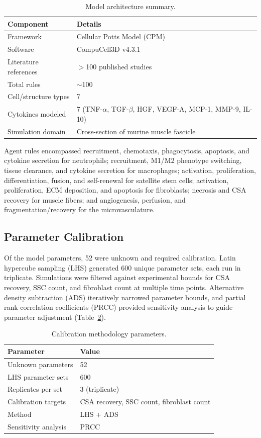 \documentclass[11pt]{article}
\begin{document}
\begin{table}[htbp]
\centering
\caption{Model architecture summary.}
\label{tab:architecture}
\begin{tabular}{ll}
\toprule
Component & Details \\
\midrule
Framework & Cellular Potts Model (CPM) \\
Software & CompuCell3D v4.3.1 \\
Literature references & $>$100 published studies \\
Total rules & $\sim$100 \\
Cell/structure types & 7 \\
Cytokines modeled & 7 (TNF-$\alpha$, TGF-$\beta$, HGF, VEGF-A, MCP-1, MMP-9, IL-10) \\
Simulation domain & Cross-section of murine muscle fascicle \\
\bottomrule
\end{tabular}
\end{table}

Agent rules encompassed recruitment, chemotaxis, phagocytosis, apoptosis, and cytokine secretion for neutrophils; recruitment, M1/M2 phenotype switching, tissue clearance, and cytokine secretion for macrophages; activation, proliferation, differentiation, fusion, and self-renewal for satellite stem cells; activation, proliferation, ECM deposition, and apoptosis for fibroblasts; necrosis and CSA recovery for muscle fibers; and angiogenesis, perfusion, and fragmentation/recovery for the microvasculature.

\subsection{Parameter Calibration}

Of the model parameters, 52 were unknown and required calibration. Latin hypercube sampling (LHS) generated 600 unique parameter sets, each run in triplicate. Simulations were filtered against experimental bounds for CSA recovery, SSC count, and fibroblast count at multiple time points. Alternative density subtraction (ADS) iteratively narrowed parameter bounds, and partial rank correlation coefficients (PRCC) provided sensitivity analysis to guide parameter adjustment (Table~\ref{tab:calibration}).

\begin{table}[htbp]
\centering
\caption{Calibration methodology parameters.}
\label{tab:calibration}
\begin{tabular}{ll}
\toprule
Parameter & Value \\
\midrule
Unknown parameters & 52 \\
LHS parameter sets & 600 \\
Replicates per set & 3 (triplicate) \\
Calibration targets & CSA recovery, SSC count, fibroblast count \\
Method & LHS + ADS \\
Sensitivity analysis & PRCC \\
\bottomrule
\end{tabular}
\end{table}
\end{document}
